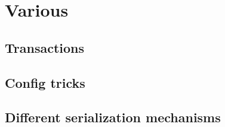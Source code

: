 \chapter{Various}

\section{Transactions}

\section{Config tricks}

\section{Different serialization mechanisms}